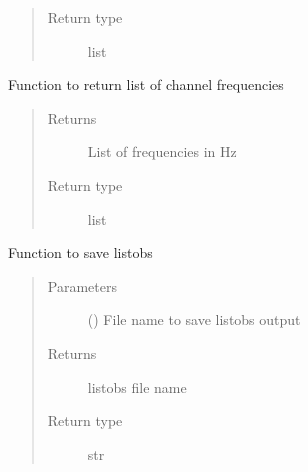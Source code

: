 \documentclass[letterpaper,10pt,english]{sphinxmanual}
\begin{document}
\begin{fulllineitems}
\begin{fulllineitems}
\begin{quote}
\begin{description}
\item[{Return type}] \leavevmode
\sphinxAtStartPar
list

\end{description}\end{quote}

\end{fulllineitems}


\begin{fulllineitems}
\label{\detokenize{paircars:paircars.access_ms.AccessMS.get_freqs}}
\sphinxAtStartPar
Function to return list of channel frequencies
\begin{quote}\begin{description}
\item[{Returns}] \leavevmode
\sphinxAtStartPar
List of frequencies in Hz

\item[{Return type}] \leavevmode
\sphinxAtStartPar
list

\end{description}\end{quote}

\end{fulllineitems}


\begin{fulllineitems}
\label{\detokenize{paircars:paircars.access_ms.AccessMS.get_listobs}}
\sphinxAtStartPar
Function to save listobs
\begin{quote}\begin{description}
\item[{Parameters}] \leavevmode
\sphinxAtStartPar
{} () \textendash{} File name to save listobs output

\item[{Returns}] \leavevmode
\sphinxAtStartPar
listobs file name

\item[{Return type}] \leavevmode
\sphinxAtStartPar
str


\end{description}
\end{quote}
\end{fulllineitems}
\end{fulllineitems}
\end{document}
